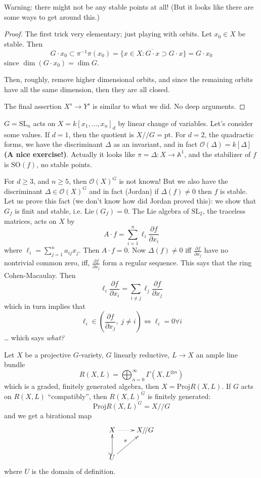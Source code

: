 Warning: there might not be any stable points at all! (But it looks like there
are some ways to get around this.)

\begin{proof}
The first trick very elementary; just playing with orbits. 
Let $x_0 \in X$ be stable. Then
$$
G\cdot x_0 \subset \pi^{-1}\pi(x_0)=\{ x \in X 
: \overline{G\cdot x}\supset G\cdot x\}=G\cdot x_0
$$
since $\dim (G\cdot x_0)=\dim G$.

Then, roughly, remove higher dimensional orbits, and since the remaining orbits
have all the same dimension, then they are all closed.

The final assertion $X^s \to Y^s$ is similar to what we did. No deep arguments.
\end{proof}

\begin{example}
\label{example-action-of-SL2-on-forms}
$G=\text{SL}_n$ acts on $X=k[x_1,\ldots,x_n]_d$ by linear change of variables.
Let's consider some values. If $d=1$, then the quotient is  $X/\!/G=\text{pt}$.
For $d=2$, the quadractic forms, we have the discriminant $\Delta$ as an 
invariant, and in fact $\mathcal{O}(\Delta)=k[\Delta]$ {\bf (A nice exercise!)}. 
Actually it looks like $\pi=\Delta:X \to \mathbb{A}^1$, and the stabilizer of 
$f$ is $\text{SO}(f)$, no stable points.

For $d \geq 3$, and $n \geq 5$, then $\mathcal{O}(X)^G$ is not known! But we
also have the discriminant $\Delta \in \mathcal{O}(X)^G$ and in fact (Jordan) if
$\Delta(f) \neq 0$ then $f$ is stable. Let us prove this fact (we don't know how
did Jordan proved this): we show that $G_f$ is finit and stable, i.e.
$\text{Lie}(G_f)=0$. The Lie algebra of $\text{SL}_2$, the traceless matrices,
acts on $X$ by
$$
A\cdot f= \sum_{i=1}^n \ell_i \frac{\partial f}{\partial x_i}
$$
where $\ell_i = \sum_{j=1}^n a_{ij}x_j$. Then $A\cdot f=0$. Now 
$\Delta(f) \neq 0$ iff $\frac{\partial f}{\partial x_j}$ have no nontrivial
common zero, iff, $\frac{\partial f}{\partial x_j}$ form a regular sequence.
This says that the ring Cohen-Macaulay. Then
$$
\ell_i \frac{\partial f}{\partial x_i}
=\sum_{i \neq  j}\ell_j \frac{\partial f}{\partial x_j}
$$
which in turn implies that
$$
\ell_i \in \left(\frac{\partial f}{\partial x_j}, \; j \neq  i\right)
\iff \ell_i=0 \forall  i
$$
… which says {\it what?}
\end{example}

\medskip\noindent
Let $X$ be a projective $G$-variety, $G$ linearly reductive, $L \to X$ an ample
line bundle
$$
R(X,L)=\bigoplus_{n=0}^{\infty} \Gamma(X,L^{\otimes n})
$$
which is a graded, finitely generated algebra, then $X=\text{Proj}R(X,L)$. If
$G$ acts on $R(X,L)$ ``compatibly'', then $R(X,L)^G$ is finitely generated:
$$
\text{Proj}R(X,L)^G=X/\!/G
$$
and we get a birational map
$$
\xymatrix{
X\ar@{.>}[r]& X/\!/G\\
U\ar@{^{(}->}[u]\ar[ur]^{\pi}
}
$$
where $U$ is the domain of definition.

